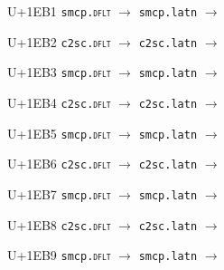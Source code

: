 \documentclass{article}
\begin{document}
\begin{substitutions}
\goodbreak

U+1EB1  \linebreak
    \texttt{smcp.\textsc{dflt}} $\to$  \linebreak
    \texttt{smcp.latn} $\to$  

\goodbreak

U+1EB2  \linebreak
    \texttt{c2sc.\textsc{dflt}} $\to$  \linebreak
    \texttt{c2sc.latn} $\to$  

\goodbreak

U+1EB3  \linebreak
    \texttt{smcp.\textsc{dflt}} $\to$  \linebreak
    \texttt{smcp.latn} $\to$  

\goodbreak

U+1EB4  \linebreak
    \texttt{c2sc.\textsc{dflt}} $\to$  \linebreak
    \texttt{c2sc.latn} $\to$  

\goodbreak

U+1EB5  \linebreak
    \texttt{smcp.\textsc{dflt}} $\to$  \linebreak
    \texttt{smcp.latn} $\to$  

\goodbreak

U+1EB6  \linebreak
    \texttt{c2sc.\textsc{dflt}} $\to$  \linebreak
    \texttt{c2sc.latn} $\to$  

\goodbreak

U+1EB7  \linebreak
    \texttt{smcp.\textsc{dflt}} $\to$  \linebreak
    \texttt{smcp.latn} $\to$  

\goodbreak

U+1EB8  \linebreak
    \texttt{c2sc.\textsc{dflt}} $\to$  \linebreak
    \texttt{c2sc.latn} $\to$  

\goodbreak

U+1EB9  \linebreak
    \texttt{smcp.\textsc{dflt}} $\to$  \linebreak
    \texttt{smcp.latn} $\to$  


\end{substitutions}
\end{document}
